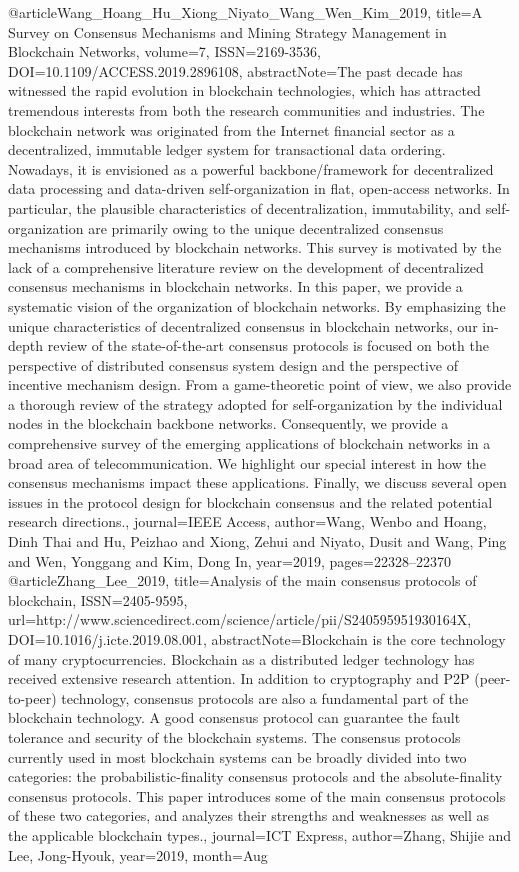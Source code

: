 {{{{ @article{Wang_Hoang_Hu_Xiong_Niyato_Wang_Wen_Kim_2019, title={A Survey on Consensus Mechanisms and Mining Strategy Management in Blockchain Networks}, volume={7}, ISSN={2169-3536}, DOI={10.1109/ACCESS.2019.2896108}, abstractNote={The past decade has witnessed the rapid evolution in blockchain technologies, which has attracted tremendous interests from both the research communities and industries. The blockchain network was originated from the Internet financial sector as a decentralized, immutable ledger system for transactional data ordering. Nowadays, it is envisioned as a powerful backbone/framework for decentralized data processing and data-driven self-organization in flat, open-access networks. In particular, the plausible characteristics of decentralization, immutability, and self-organization are primarily owing to the unique decentralized consensus mechanisms introduced by blockchain networks. This survey is motivated by the lack of a comprehensive literature review on the development of decentralized consensus mechanisms in blockchain networks. In this paper, we provide a systematic vision of the organization of blockchain networks. By emphasizing the unique characteristics of decentralized consensus in blockchain networks, our in-depth review of the state-of-the-art consensus protocols is focused on both the perspective of distributed consensus system design and the perspective of incentive mechanism design. From a game-theoretic point of view, we also provide a thorough review of the strategy adopted for self-organization by the individual nodes in the blockchain backbone networks. Consequently, we provide a comprehensive survey of the emerging applications of blockchain networks in a broad area of telecommunication. We highlight our special interest in how the consensus mechanisms impact these applications. Finally, we discuss several open issues in the protocol design for blockchain consensus and the related potential research directions.}, journal={IEEE Access}, author={Wang, Wenbo and Hoang, Dinh Thai and Hu, Peizhao and Xiong, Zehui and Niyato, Dusit and Wang, Ping and Wen, Yonggang and Kim, Dong In}, year={2019}, pages={22328–22370} }
 @article{Zhang_Lee_2019, title={Analysis of the main consensus protocols of blockchain}, ISSN={2405-9595}, url={http://www.sciencedirect.com/science/article/pii/S240595951930164X}, DOI={10.1016/j.icte.2019.08.001}, abstractNote={Blockchain is the core technology of many cryptocurrencies. Blockchain as a distributed ledger technology has received extensive research attention. In addition to cryptography and P2P (peer-to-peer) technology, consensus protocols are also a fundamental part of the blockchain technology. A good consensus protocol can guarantee the fault tolerance and security of the blockchain systems. The consensus protocols currently used in most blockchain systems can be broadly divided into two categories: the probabilistic-finality consensus protocols and the absolute-finality consensus protocols. This paper introduces some of the main consensus protocols of these two categories, and analyzes their strengths and weaknesses as well as the applicable blockchain types.}, journal={ICT Express}, author={Zhang, Shijie and Lee, Jong-Hyouk}, year={2019}, month={Aug} }
}}}}
